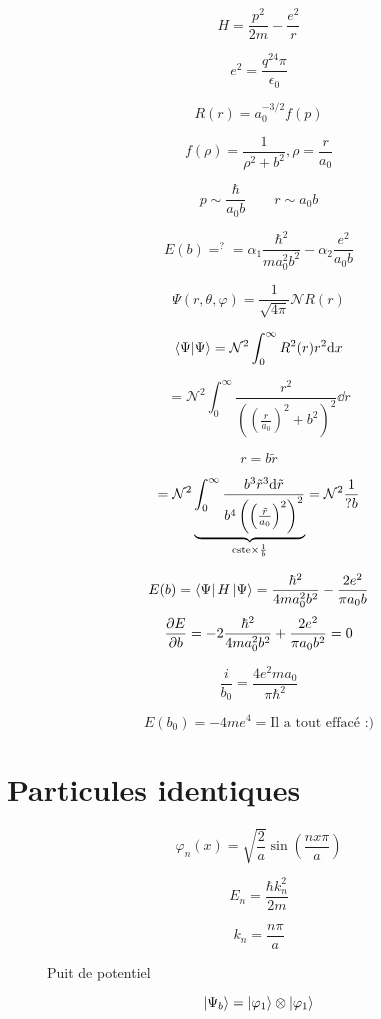 



$$H = \frac{p^2}{2m} - \frac{e^2}{r} $$ 

$$e^2 = \frac{q^24\pi}{\epsilon_{0}} $$ 

$$R(r) = a_{0}^{-3/2} f(p)$$ 

$$f(\rho)= \frac{1}{\rho^2+b^2}, \rho = \frac{r}{a_{0}} $$ 

$$p\sim \frac{\hbar}{a_{0}b} \qquad r \sim a_{0} b $$ 


$$E(b) =^? = \alpha_{1} \frac{\hbar^2}{ma_{0}^2b^2} -\alpha_{2} \frac{e^2}{a_{0}b}  $$ 

$$\Psi(r, \theta, \varphi) = \frac{1}{\sqrt{4\pi}} \mathcal{N}  R(r)$$ 

$$\braket{\Psi}{\Psi} = \mathcal{N}^2 \int_{0}^\infty R^2(r) r^2 \dd x$$ 

$$= \mathcal{N}^2 \int_{0}^\infty \frac{r^2}{\left( \left( \frac{r}{a_{0}}  \right)^2 + b^2 \right)^2} \dd r$$ 

$$\boxed{r  = b \tilde r}$$ 

$$= \mathcal{N}^2 \underbrace{\int_{0}^\infty \frac{b^3 \tilde r^3 \dd \tilde r}{b^4 \left( \left( \frac{\tilde r}{a_0} \right)^2  \right)^2}}_{{\rm cste} \times \frac{1}{b} }  = \mathcal{N}^2 \frac{1}{?b} $$ 

$$E(b) = \bra{\Psi} H \ket{\Psi} = \frac{\hbar^2}{4ma_{0}^2b^2} - \frac{2e^2}{\pi a_{0} b} $$ 
$$\pdv{E}{b} = -2 \frac{\hbar^2}{4ma_{0}^2b^2} + \frac{2e^2}{\pi a_{0} b^2} =0  $$ 

$$\frac{i}{b_{0}} = \frac{4e^2ma_{0}}{\pi\hbar^2}$$  

$$E(b_{0} ) = - 4me^4 = \text{Il a tout effacé :)}$$ 


\section*{Particules identiques}

$$\varphi_{n} (x) = \sqrt{\frac{2}{a} } \sin(\frac{nx\pi}{a} )$$ 

$$E_{n} = \frac{\hbar{}k_{n}^2}{2m} $$ 

$$k_{n} = \frac{n\pi}{a} $$ 

\begin{figure}[ht]
    \centering
    \caption{Puit de potentiel}
    \label{fig:puit-de-potentiel}
\end{figure}

$$\ket{\Psi_{b} } = \ket{\varphi_1} \otimes \ket{\varphi_1}$$ 


